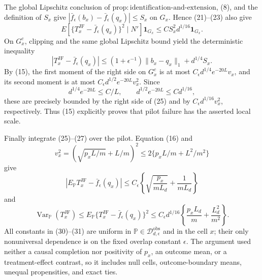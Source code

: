 The global Lipschitz conclusion of \(\mathrm{prop:identification\mbox{-}and\mbox{-}extension}\), (8), and the definition of \(S_x\) give \(|\bar f_\epsilon(b_x)-\bar f_\epsilon(q_x)|\leq S_x\) on \(G_x\).  Hence (21)--(23) also give
\[
 E\!\left[\{T_x^{\mathrm{JF}}-\bar f_\epsilon(q_x)\}^2
 \mid N'\right]\mathbf1_{G_x}
 \leq C S_x^2d^{1/16}\mathbf1_{G_x}.                              \tag{26}
\]
On \(G_x^c\), clipping and the same global Lipschitz bound yield the deterministic inequality
\[
 |T_x^{\mathrm{JF}}-\bar f_\epsilon(q_x)|
 \leq(1+\epsilon^{-1})\|b_x-q_x\|_1+d^{1/4}S_x.                  \tag{27}
\]
By (15), the first moment of the right side on \(G_x^c\) is at most \(C_\epsilon d^{1/4}e^{-20L}v_x\), and its second moment is at most \(C_\epsilon d^{1/2}e^{-20L}v_x^2\).  Since
\[
 d^{1/4}e^{-20L}\leq C/L,
 \qquad d^{1/2}e^{-20L}\leq C d^{1/16},                            \tag{28}
\]
these are precisely bounded by the right side of (25) and by \(C_\epsilon d^{1/16}v_x^2\), respectively.  Thus (15) explicitly proves that pilot failure has the asserted local scale.

Finally integrate (25)--(27) over the pilot.  Equation (16) and
\[
 v_x^2=(\sqrt{p_xL/m}+L/m)^2
 \leq2\{p_xL/m+L^2/m^2\}                                        \tag{29}
\]
give
\[
 \left|E_{\mathbb P}T_x^{\mathrm{JF}}-\bar f_\epsilon(q_x)\right|
 \leq C_\epsilon\left\{\sqrt{\frac{p_x}{mL_d}}+\frac1{mL_d}\right\} \tag{30}
\]
and
\[
 \operatorname{Var}_{\mathbb P}(T_x^{\mathrm{JF}})
 \leq E_{\mathbb P}\{T_x^{\mathrm{JF}}-\bar f_\epsilon(q_x)\}^2
 \leq C_\epsilon d^{1/16}
 \left\{\frac{p_xL_d}{m}+\frac{L_d^2}{m^2}\right\}.             \tag{31}
\]
All constants in (30)--(31) are uniform in \(\mathbb P\in\mathcal D_{d,\epsilon}^{\mathrm{obs}}\) and in the cell \(x\); their only nonuniversal dependence is on the fixed overlap constant \(\epsilon\).  The argument used neither a causal completion nor positivity of \(p_x\), an outcome mean, or a treatment-effect contrast, so it includes null cells, outcome-boundary means, unequal propensities, and exact ties.